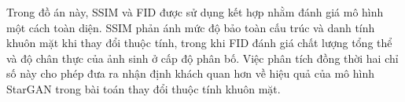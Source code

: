 \documentclass[../DoAn.tex]{subfiles}
\begin{document}
Trong đồ án này, SSIM và FID được sử dụng kết hợp nhằm đánh giá mô hình một cách toàn diện. SSIM phản ánh mức độ bảo toàn cấu trúc và danh tính khuôn mặt khi thay đổi thuộc tính, trong khi FID đánh giá chất lượng tổng thể và độ chân thực của ảnh sinh ở cấp độ phân bố. Việc phân tích đồng thời hai chỉ số này cho phép đưa ra nhận định khách quan hơn về hiệu quả của mô hình StarGAN trong bài toán thay đổi thuộc tính khuôn mặt.






\end{document}
